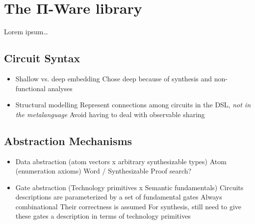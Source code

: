 \documentclass[a4paper,draft]{report}
\begin{document}
    \chapter{The Π-Ware library}
    \label{chap:piware}
        Lorem ipsum\ldots


        \section{Circuit Syntax}
        \label{sec:circuit-types}
            \begin{itemize}
                \item Shallow vs. deep embedding
                    \subitem Chose deep because of synthesis and non-functional analyses
                \item Structural modelling
                    \subitem Represent connections among circuits in the DSL, \emph{not in the metalanguage}
                    \subitem Avoid having to deal with observable sharing
            \end{itemize}

        \section{Abstraction Mechanisms}
        \label{sec:abstraction}
            \begin{itemize}
                \item Data abstraction (atom vectors x arbitrary synthesizable types)
                    \subitem Atom (enumeration axioms)
                    \subitem Word / Synthesizable
                        \subsubitem Proof search?
                \item Gate abstraction (Technology primitives x Semantic fundamentals)
                    \subitem Circuits descriptions are parameterized by a set of fundamental gates
                        \subsubitem Always combinational
                        \subsubitem Their correctness is assumed
                    \subitem For synthesis, still need to give these gates a description in terms of technology primitives
            \end{itemize}
\end{document}
